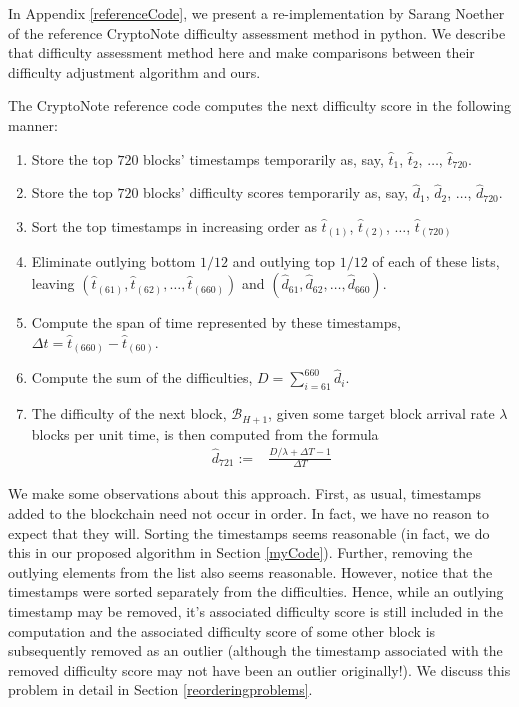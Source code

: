 \documentclass[12pt,english]{mrl}
\theoremstyle{definition}
\numberwithin{equation}{section}
\numberwithin{figure}{section}
\numberwithin{equation}{section}
\numberwithin{equation}{section}
\numberwithin{figure}{section}
\begin{document}
In Appendix \ref{referenceCode}, we present a re-implementation by Sarang Noether of the reference CryptoNote difficulty assessment method in python. We describe that difficulty assessment method here and make comparisons between their difficulty adjustment algorithm and ours.

The CryptoNote reference code computes the next difficulty score in the following manner:
\begin{enumerate}[(1)]
\item Store the top $720$ blocks' timestamps temporarily as, say, $\hat{t}_1$, $\hat{t}_2$, $\ldots$, $\hat{t}_{720}$.
\item Store the top $720$ blocks' difficulty scores temporarily as, say,
$\hat{d}_1$, $\hat{d}_2$, $\ldots$, $\hat{d}_{720}$.
\item Sort the top timestamps in increasing order as $\hat{t}_{(1)}$, $\hat{t}_{(2)}$, $\ldots$, $\hat{t}_{(720)}$
\item Eliminate outlying bottom $1/12$ and outlying top $1/12$ of each of these lists, leaving $(\hat{t}_{(61)}, \hat{t}_{(62)}, \ldots, \hat{t}_{(660)})$ and $(\hat{d}_{61}, \hat{d}_{62}, \ldots, \hat{d}_{660})$.
\item Compute the span of time represented by these timestamps, $\Delta t = \hat{t}_{(660)} - \hat{t}_{(60)}$.
\item Compute the sum of the difficulties, $D = \sum_{i=61}^{660} \hat{d}_i$.
\item The difficulty of the next block, $\mathcal{B}_{H+1}$, given some target block arrival rate $\lambda$ blocks per unit time, is then computed from the formula
\begin{align}
\hat{d}_{721} :=&\frac{D/\lambda + \Delta T - 1}{\Delta T} \label{diffFormInitial}
\end{align}
\end{enumerate}

We make some observations about this approach. First, as usual, timestamps added to the blockchain need not occur in order. In fact, we have no reason to expect that they will. Sorting the timestamps seems reasonable (in fact, we do this in our proposed algorithm in Section \ref{myCode}). Further, removing the outlying elements from the list also seems reasonable. However, notice that the timestamps were sorted separately from the difficulties. Hence, while an outlying timestamp may be removed, it's associated difficulty score is still included in the computation and the associated difficulty score of some other block is subsequently removed as an outlier (although the timestamp associated with the removed difficulty score may not have been an outlier originally!).  We discuss this problem in detail in Section \ref{reorderingproblems}.
\end{document}
